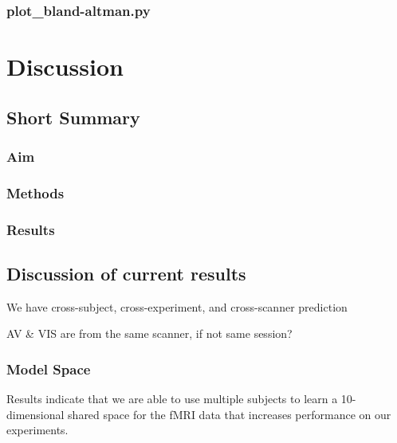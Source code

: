 

\subsubsection{plot\_bland-altman.py}




\section{Discussion}


\subsection{Short Summary}

\subsubsection{Aim}

\subsubsection{Methods}

\subsubsection{Results}


\subsection{Discussion of current results}


We have cross-subject, cross-experiment, and cross-scanner prediction


AV \& VIS are from the same scanner, if not same session?

\subsubsection{Model Space}
%
Results indicate that we are able to use multiple subjects to learn a
10-dimensional shared space for the fMRI data that increases performance on our
experiments.

